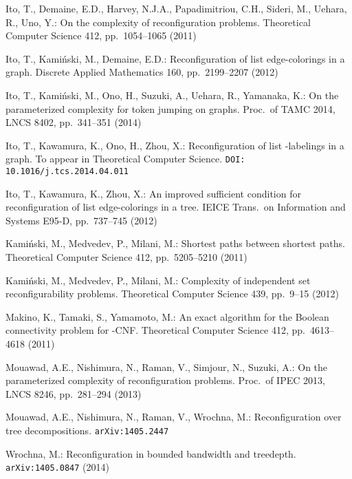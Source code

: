 \documentclass{llncs}
\begin{document}
\begin{thebibliography}{10}
Ito, T., Demaine, E.D., Harvey, N.J.A., Papadimitriou, C.H., Sideri, M., Uehara, R., Uno, Y.: 
On the complexity of reconfiguration problems.
Theoretical Computer Science 
412, pp.~1054--1065 (2011)

Ito, T., Kami\'nski, M., Demaine, E.D.: 
Reconfiguration of list edge-colorings in a graph. 
Discrete Applied Mathematics 160, pp.~2199--2207 (2012)

Ito, T., Kami\'nski, M., Ono, H., Suzuki, A., Uehara, R., Yamanaka, K.:
On the parameterized complexity for token jumping on graphs.
Proc.~of TAMC 2014, 
LNCS 8402, 
pp.~341--351 (2014)

Ito, T., Kawamura, K., Ono, H., Zhou, X.: 
Reconfiguration of list -labelings in a graph. 
To appear in 
Theoretical Computer Science. 
{\tt DOI: 10.1016/j.tcs.2014.04.011}

Ito, T., Kawamura, K., Zhou, X.: 
An improved sufficient condition for reconfiguration of list edge-colorings in a tree. 
IEICE Trans.~on Information and Systems E95-D, pp.~737--745 (2012) 

Kami\'nski, M., Medvedev, P., Milani, M.: 
Shortest paths between shortest paths.
Theoretical Computer Science 
412, pp.~5205--5210 (2011)

Kami\'nski, M., Medvedev, P., Milani, M.: 
Complexity of independent set reconfigurability problems.
Theoretical Computer Science 
439, pp.~9--15 (2012)

Makino, K., Tamaki, S., Yamamoto, M.:
An exact algorithm for the Boolean connectivity problem for -CNF.
Theoretical Computer Science 
412, pp.~4613--4618 (2011)

Mouawad, A.E., Nishimura, N., Raman, V., Simjour, N., Suzuki, A.: 
On the parameterized complexity of reconfiguration problems.
Proc.~of IPEC 2013, 
LNCS 8246, 
pp.~281--294 (2013)

Mouawad, A.E., Nishimura, N., Raman, V., Wrochna, M.: 
Reconfiguration over tree decompositions.
{\tt arXiv:1405.2447}

Wrochna, M.:
Reconfiguration in bounded bandwidth and treedepth.
{\tt  arXiv:1405.0847} (2014)
\end{thebibliography}
\end{document}
